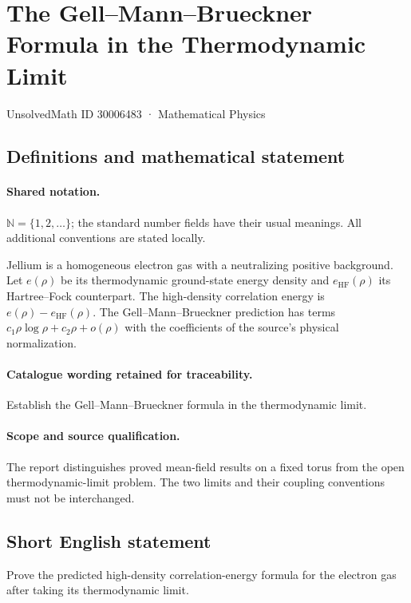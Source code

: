 \documentclass[11pt]{article}
\begin{document}
\setcounter{section}{30006482}
\section{The Gell–Mann–Brueckner Formula in the Thermodynamic Limit}\label{30006483}
{\small UnsolvedMath ID 30006483 · Mathematical Physics}
\subsection{Definitions and mathematical statement}

\paragraph{Shared notation.}$\mathbb N=\{1,2,\ldots\}$; the standard number fields have their usual meanings. All additional conventions are stated locally.


Jellium is a homogeneous electron gas with a neutralizing positive background. Let $e(\rho)$ be its thermodynamic ground-state energy density and $e_{\mathrm{HF}}(\rho)$ its Hartree--Fock counterpart. The high-density correlation energy is $e(\rho)-e_{\mathrm{HF}}(\rho)$. The Gell--Mann--Brueckner prediction has terms $c_1\rho\log\rho+c_2\rho+o(\rho)$ with the coefficients of the source's physical normalization.

\paragraph{Catalogue wording retained for traceability.}
Establish the Gell–Mann–Brueckner formula in the thermodynamic limit.

\paragraph{Scope and source qualification.}The report distinguishes proved mean-field results on a fixed torus from the open thermodynamic-limit problem. The two limits and their coupling conventions must not be interchanged.
\subsection{Short English statement}
Prove the predicted high-density correlation-energy formula for the electron gas after taking its thermodynamic limit.
\end{document}
